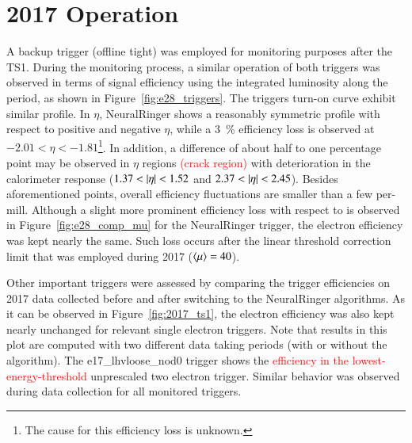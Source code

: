 \section{2017 Operation}\label{ssec:2017_ringer_operation}


A backup trigger (offline tight) was employed for
monitoring purposes after the TS1. During the monitoring process, a similar
operation of both triggers was observed in terms of signal efficiency using the
integrated luminosity along the period, as shown in
Figure~\ref{fig:e28_triggers}. The triggers
turn-on curve exhibit similar profile. In $\eta$, NeuralRinger shows a reasonably symmetric
profile with respect to positive and negative $\eta$, while a
\SI{3}{\%} efficiency loss is observed at $-2.01<\eta<-1.81$\footnote{The cause for this efficiency loss is unknown.}. In addition, a difference of about
half to one percentage point may be observed in $\eta$ regions \textcolor{red}{(crack region)} with deterioration in the calorimeter
response ($1.37 < \abseta < 1.52$ and $2.37 < \abseta < 2.45$). Besides
aforementioned points, overall efficiency fluctuations are smaller than a few
per-mill. Although a slight more prominent efficiency loss with respect to
\avgmu{} is observed in Figure~\ref{fig:e28_comp_mu} for the NeuralRinger trigger, the
electron efficiency was kept nearly the same. Such loss occurs after the
linear threshold correction limit that was employed during 2017 ($\langle \mu \rangle=40$).

Other important triggers were assessed by comparing the trigger efficiencies on
2017 data collected before and after switching to the NeuralRinger algorithms.  As it can be
observed in Figure~\ref{fig:2017_ts1}, the electron efficiency was also kept
nearly unchanged for relevant single electron triggers. Note that results in
this plot are computed with two different data taking periods (with or
without the \rnn{} algorithm). The e17\_lhvloose\_nod0 trigger shows the
\textcolor{red}{efficiency in the lowest-energy-threshold} 
unprescaled two electron trigger.
Similar behavior was observed during data collection for all monitored triggers.


